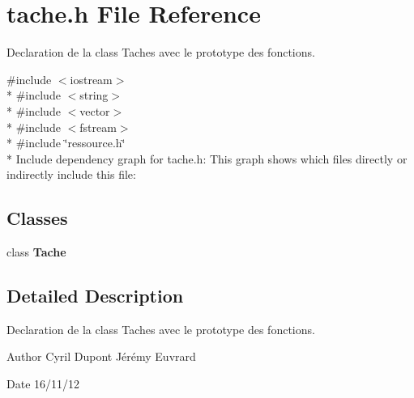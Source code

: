 \section{tache.\-h File Reference}
\label{tache_8h}


Declaration de la class Taches avec le prototype des fonctions.  


{\ttfamily \#include $<$iostream$>$}\\*
{\ttfamily \#include $<$string$>$}\\*
{\ttfamily \#include $<$vector$>$}\\*
{\ttfamily \#include $<$fstream$>$}\\*
{\ttfamily \#include \char`\"{}ressource.\-h\char`\"{}}\\*
Include dependency graph for tache.\-h\-:
This graph shows which files directly or indirectly include this file\-:
\subsection*{Classes}
\begin{DoxyCompactItemize}
\item 
class {\bf Tache}
\end{DoxyCompactItemize}


\subsection{Detailed Description}
Declaration de la class Taches avec le prototype des fonctions. \begin{DoxyAuthor}{Author}
Cyril Dupont Jérémy Euvrard 
\end{DoxyAuthor}
\begin{DoxyDate}{Date}
16/11/12 
\end{DoxyDate}
